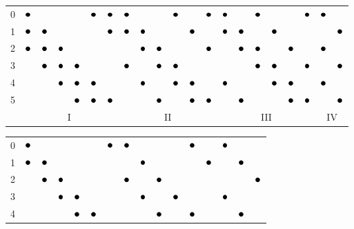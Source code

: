 \documentclass[eikonal.tex]{subfiles}
\begin{document}
\begin{figure}[t]
  \centering
  {
    \footnotesize
    \begin{tabular}{c|cccccc|cccccc|cccccc|cc}
      0 & $\groupmarker$ & & & & $\groupmarker$ & $\groupmarker$ & $\groupmarker$ & & & $\groupmarker$ & & $\groupmarker$ & $\groupmarker$ & & $\groupmarker$ & & & $\groupmarker$ & $\groupmarker$ & \\
      1 & $\groupmarker$ & $\groupmarker$ & & & & $\groupmarker$ & $\groupmarker$ & $\groupmarker$ & & & $\groupmarker$ & & $\groupmarker$ & $\groupmarker$ & & $\groupmarker$ & & & & $\groupmarker$ \\
      2 & $\groupmarker$ & $\groupmarker$ & $\groupmarker$ & & & & & $\groupmarker$ & $\groupmarker$ & & & $\groupmarker$ & & $\groupmarker$ & $\groupmarker$ & & $\groupmarker$ & & $\groupmarker$ & \\
      3 & & $\groupmarker$ & $\groupmarker$ & $\groupmarker$ & & & $\groupmarker$ & & $\groupmarker$ & $\groupmarker$ & & & & & $\groupmarker$ & $\groupmarker$ & & $\groupmarker$ & & $\groupmarker$ \\
      4 & & & $\groupmarker$ & $\groupmarker$ & $\groupmarker$ & & & $\groupmarker$ & & $\groupmarker$ & $\groupmarker$ & & $\groupmarker$ & & & $\groupmarker$ & $\groupmarker$ & & $\groupmarker$ & \\
      5 & & & & $\groupmarker$ & $\groupmarker$ & $\groupmarker$ & & & $\groupmarker$ & & $\groupmarker$ & $\groupmarker$ & & $\groupmarker$ & & & $\groupmarker$ & $\groupmarker$ & & $\groupmarker$ \\
      \multicolumn{1}{c}{} & \multicolumn{6}{c}{I} & \multicolumn{6}{c}{II} & \multicolumn{6}{c}{III} & \multicolumn{2}{c}{IV}
    \end{tabular}%
    \vspace{1em}
    \begin{tabular}{c|cccccc|cccccc|ccc}
      0 & $\groupmarker$ & & & & & $\groupmarker$ & $\groupmarker$ & & & & $\groupmarker$ & & $\groupmarker$ & & \\
      1 & $\groupmarker$ & $\groupmarker$ & & & & & & $\groupmarker$ & & & & $\groupmarker$ & & $\groupmarker$ & \\
      2 & & $\groupmarker$ & $\groupmarker$ & & & & $\groupmarker$ & & $\groupmarker$ & & & & & & $\groupmarker$ \\
      3 & & & $\groupmarker$ & $\groupmarker$ & & & & $\groupmarker$ & & $\groupmarker$ & & & $\groupmarker$ & & \\
      4 & & & & $\groupmarker$ & $\groupmarker$ & & & & $\groupmarker$ & & $\groupmarker$ & & & $\groupmarker$ & \\

\end{tabular}}
\end{figure}
\end{document}
